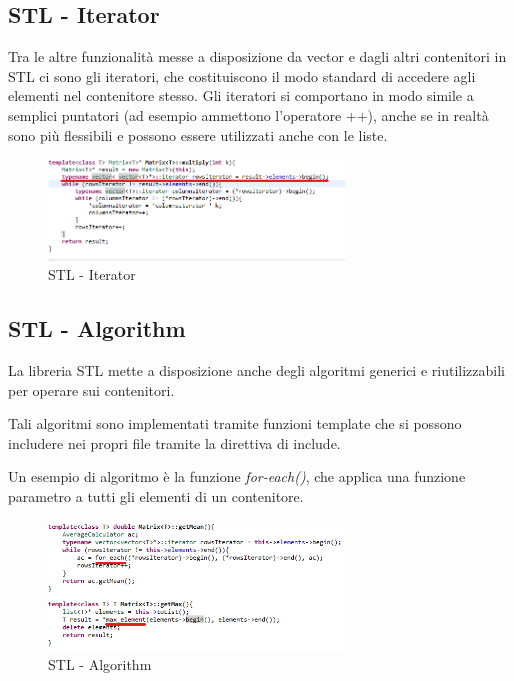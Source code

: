 \subsection{STL - Iterator}
Tra le altre funzionalità messe a disposizione da vector e dagli altri contenitori in STL ci sono gli
iteratori, che costituiscono il modo standard di accedere agli elementi nel contenitore stesso. Gli
iteratori si comportano in modo simile a semplici puntatori (ad esempio ammettono l'operatore ++),
anche se in realtà sono più flessibili e possono essere utilizzati anche con le liste.

\begin{figure}[h]
	\centering
	\includegraphics[width=0.7\textwidth]{Immagini/Stl_Iterator.png}
	\caption{STL - Iterator}
	\label{fig:Iterator}
\end{figure}

\subsection{STL - Algorithm}
La libreria STL mette a disposizione anche degli algoritmi generici e riutilizzabili per operare sui contenitori.

Tali algoritmi sono implementati tramite funzioni template che si possono includere nei propri file tramite la direttiva di include.

Un esempio di algoritmo è la funzione \textit{for-each()}, che applica una funzione parametro a tutti gli
elementi di un contenitore.

\begin{figure}[h]
	\centering
	\includegraphics[width=0.7\textwidth]{Immagini/Stl_Algorithm.png}
	\caption{STL - Algorithm}
	\label{fig:Algoritm}
\end{figure}
